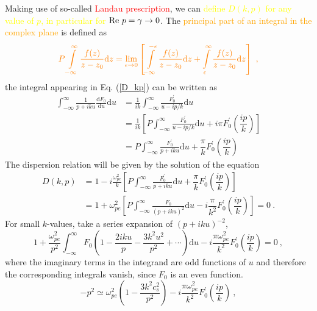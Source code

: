 \documentclass[12pt,a4paper]{article}
\newcommand{\dif}{\mathrm{d}}
\begin{document}
Making use of so-called \textcolor{red}{Landau prescription}, we can \textcolor{yellow}{define $D(k, p)$ for any value of $p$, in particular for ${\rm Re}~ p = \gamma  \rightarrow 0$}. The \textcolor{orange}{principal part of an integral in the complex plane} is defined as
\begin{equation*}
\color{orange} P \int\limits_{-\infty}^\infty \frac{f(z)}{z-z_0} \dif z = \underset{\epsilon\rightarrow 0}\lim \left[\int\limits_{-\infty}^{-\epsilon} \frac{f(z)}{z-z_0} \dif z +\int\limits_{\epsilon}^\infty \frac{f(z)}{z-z_0} \dif z \right] ~,
\end{equation*}
the integral appearing in Eq. (\ref{D_kp}) can be written as
\begin{align}
\nonumber \int_{-\infty}^\infty  \frac{1}{p+iku} \frac{\dif F_0}{\dif u}  \dif u &= \frac{1}{ik} \int_{-\infty}^\infty  \frac{F^\prime_0}{u-ip/k} \dif u \\
\nonumber &= \frac{1}{ik} \left[P \int_{-\infty}^\infty  \frac{F^\prime_0}{u-ip/k} \dif u +i\pi F^\prime_0\left(\dfrac{ip}{k} \right) \right] \\
&= P \int_{-\infty}^\infty  \frac{F^\prime_0}{p +iku} \dif u +\dfrac{\pi}{k} F^\prime_0\left(\dfrac{ip}{k} \right)
\end{align}
The dispersion relation will be given by the solution of the equation
\begin{align}
\nonumber D(k, p) &= 1 -i \frac{\omega^2_{pe} }{k} \left[ P \int_{-\infty}^\infty  \frac{F^\prime_0}{p +iku} \dif u +\dfrac{\pi}{k} F^\prime_0\left(\dfrac{ip}{k} \right) \right] \\
&= 1 +\omega^2_{pe} \left[ P \int_{-\infty}^\infty  \frac{F_0}{(p +iku)^2} \dif u -i\dfrac{\pi}{k^2} F^\prime_0\left(\dfrac{ip}{k} \right) \right] = 0 ~.
\end{align}
For small $k$-values, take a series expansion of $(p + iku)^{-2}$,
\begin{equation}
1 +\frac{\omega^2_{pe} }{p^2} \int_{-\infty}^\infty F_0\left(1- \frac{2iku}{p} -\frac{3k^2 u^2}{p^2} +\cdots \right) \dif u -i \frac{\pi \omega_{pe}^2}{k^2} F^\prime_0\left(\dfrac{ip}{k} \right) = 0 ~,
\end{equation}
where the imaginary terms in the integrand are odd functions of $u$ and therefore the corresponding integrals vanish, since $F_0$ is an even function. 
\begin{equation}
-p^2 \simeq \omega^2_{pe} \left(1 -\frac{3k^2 c_s^2}{p^2} \right) -i\frac{\pi \omega_{pe}^2}{k^2} F^\prime_0\left(\dfrac{ip}{k} \right) ~,
\label{disp_rela}
\end{equation}
\end{document}
